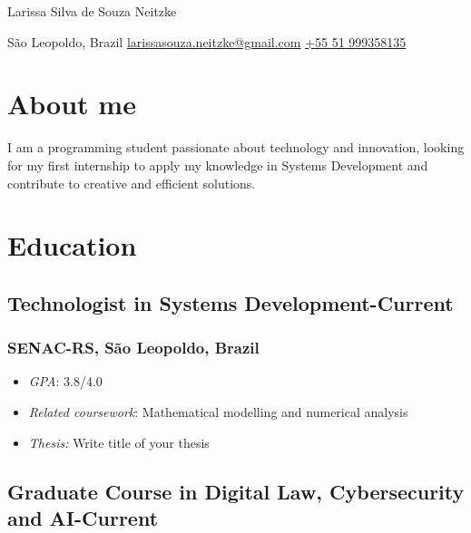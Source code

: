 \documentclass[11pt]{article}
\begin{document}
\begin{center}      
    {\fontsize{28}{28}\selectfont Larissa Silva de Souza Neitzke} \\ \bigskip

    {\color{icnclr}\faMapMarker} São Leopoldo, Brazil \quad 
    {\color{icnclr}\faEnvelope[regular]} \href{mailto:myaname@email.com}{larissasouza.neitzke@gmail.com} \quad
    {\color{icnclr}} \href{tel:+920000000000}{+55 51 999358135} 
\end{center}
\section{About me}
I am a programming student passionate about technology and innovation, looking for my first internship to apply my knowledge in Systems Development and contribute to creative and efficient solutions. 
\section{Education}
\subsection{Technologist in Systems Development\hfill {}-Current}  

\subsubsection{SENAC-RS,  São Leopoldo, Brazil}
\begin{itemize}
    \item[\checkmark] \textit{GPA}: 3.8/4.0
    \item[\checkmark] \textit{Related coursework}: Mathematical modelling and numerical analysis
    \item[\checkmark] \textit{Thesis:} Write title of your thesis
    \end{itemize}
\subsection{Graduate Course in Digital Law, Cybersecurity and AI\hfill {}-Current}  
\end{document}
